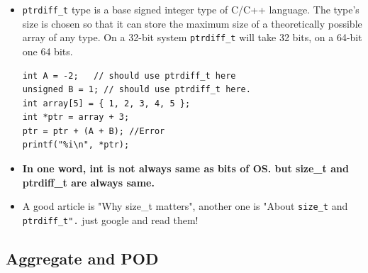 \documentclass[a4paper,11pt,twoside]{book}
\begin{document}
\begin{itemize}
	
	\item \texttt{ptrdiff\_t} type is a base signed integer type of C/C++ language. The type's size is chosen so that it can store the maximum size of a theoretically possible array of any type. On a 32-bit system \texttt{ptrdiff\_t} will take 32 bits, on a 64-bit one 64 bits.
\begin{lstlisting}[numbers=none]
int A = -2;   // should use ptrdiff_t here
unsigned B = 1; // should use ptrdiff_t here.
int array[5] = { 1, 2, 3, 4, 5 };
int *ptr = array + 3;
ptr = ptr + (A + B); //Error
printf("%i\n", *ptr);
\end{lstlisting}
	
	\item \textbf{In one word, int is not always same as bits of OS. but size\_t and ptrdiff\_t are always same.}
	
	\item A good article is "Why size\_t matters", another one is "About \texttt{size\_t} and \texttt{ptrdiff\_t".} just google and read them!   
\end{itemize}

\subsection{Aggregate and POD}
\end{document}
